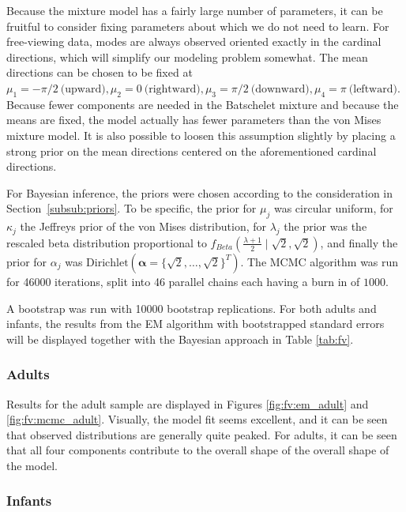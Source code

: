 Because the mixture model has a fairly large number of parameters, it can be fruitful to consider fixing parameters about which we do not need to learn. For free-viewing data, modes are always observed oriented exactly in the cardinal directions, which will simplify our modeling problem somewhat. The mean directions can be chosen to be fixed at \(\mu_1 = -\pi / 2 ~\text{(upward)},\mu_2 = 0 ~\text{(rightward)},\mu_3 = \pi / 2 ~\text{(downward)},\mu_4 = \pi ~\text{(leftward)}\). Because fewer components are needed in the Batschelet mixture and because the means are fixed, the model actually has fewer parameters than the von Mises mixture model. It is also possible to loosen this assumption slightly by placing a strong prior on the mean directions centered on the aforementioned cardinal directions.

For Bayesian inference, the priors were chosen according to the consideration in Section~\ref{subsub:priors}. To be specific, the prior for \(\mu_j\) was circular uniform, for \(\kappa_j\) the Jeffreys prior of the von Mises distribution, for \(\lambda_j\) the prior was the rescaled beta distribution proportional to \(f_{Beta} \left(\frac{\lambda + 1}{2} \mid \sqrt{2}, \sqrt{2}\right)\), and finally the prior for \(\alpha_j\) was \(\text{Dirichlet}(\boldsymbol{\alpha} = \{\sqrt{2}, \dots, \sqrt{2}\}^T)\). The MCMC algorithm was run for 46000 iterations, split into 46 parallel chains each having a burn in of \(1000\).

A bootstrap was run with 10000 bootstrap replications. For both adults and infants, the results from the EM algorithm with bootstrapped standard errors will be displayed together with the Bayesian approach in Table \ref{tab:fv}.

\subsubsection{Adults}

Results for the adult sample are displayed in Figures \ref{fig:fv:em_adult} and \ref{fig:fv:mcmc_adult}. Visually, the model fit seems excellent, and it can be seen that observed distributions are generally quite peaked. For adults, it can be seen that all four components contribute to the overall shape of the overall shape of the model.

\subsubsection{Infants}

